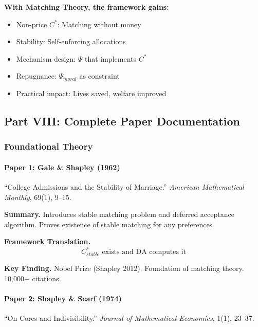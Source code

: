 \textbf{With Matching Theory, the framework gains:}
\begin{itemize}
    \item Non-price $C^*$: Matching without money
    \item Stability: Self-enforcing allocations
    \item Mechanism design: $\Psi$ that implements $C^*$
    \item Repugnance: $\Psi_{moral}$ as constraint
    \item Practical impact: Lives saved, welfare improved
\end{itemize}

\subsection{Part VIII: Complete Paper Documentation}

\subsubsection{Foundational Theory}

\paragraph{Paper 1: Gale \& Shapley (1962)}

``College Admissions and the Stability of Marriage.''
\textit{American Mathematical Monthly}, 69(1), 9--15.

\textbf{Summary.}
Introduces stable matching problem and deferred acceptance algorithm.
Proves existence of stable matching for any preferences.

\textbf{Framework Translation.}
\begin{equation}
C^*_{stable} \text{ exists and DA computes it}
\end{equation}

\textbf{Key Finding.}
Nobel Prize (Shapley 2012). Foundation of matching theory. 10,000+ citations.

\paragraph{Paper 2: Shapley \& Scarf (1974)}

``On Cores and Indivisibility.''
\textit{Journal of Mathematical Economics}, 1(1), 23--37.

